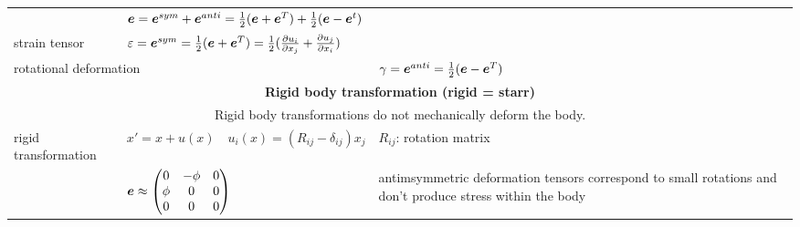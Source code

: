 \begin{tabularx}{\columnwidth}{p{2cm}XX}
			&
			\multicolumn{2}{l}{$\bm e = \bm e^{sym} + \bm e^{anti} = \frac{1}{2}(\bm e+\bm e^T) + \frac{1}{2}(\bm e - \bm e^t)$ }\\

			strain tensor & $\varepsilon = \bm e^{sym} = \frac{1}{2}(\bm e+\bm e^T)= \frac{1}{2} (\frac{\partial u_i}{\partial x_j} + \frac{\partial
				u_j}{\partial x_i})$  &\\
			\multicolumn{2}{l}{rotational deformation} & $\gamma = \bm e^{anti} = \frac{1}{2}(\bm e-\bm e^T)$ \\
			\hline
			\multicolumn{3}{c}{\textbf{Rigid body transformation (rigid = starr)}}\\
			\multicolumn{3}{c}{Rigid body transformations do not mechanically deform the body. }\\
			rigid transformation &   
			$x' = x + u(x) \quad u_i(x) = (R_{ij} - \delta_{ij})x_j$ & $R_{ij}$: rotation matrix\\
			&  $\bm e \approx \begin{pmatrix} 0 & -\phi &0 \\ \phi &  0& 0 \\  0& 0 & 0\\	\end{pmatrix}$ &
			antimsymmetric deformation tensors correspond to small rotations and don't produce stress within the body\\


\end{tabularx}
